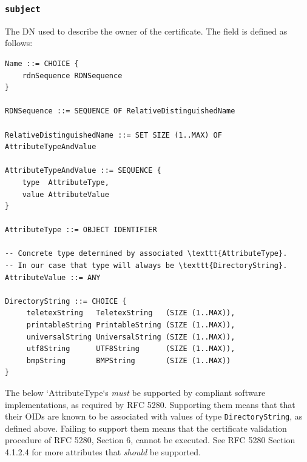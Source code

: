 \subsubsection{\texttt{subject}}

The DN used to describe the owner of the certificate.
The field is defined as follows:

\begin{verbatim}
Name ::= CHOICE {
    rdnSequence RDNSequence
}

RDNSequence ::= SEQUENCE OF RelativeDistinguishedName

RelativeDistinguishedName ::= SET SIZE (1..MAX) OF AttributeTypeAndValue

AttributeTypeAndValue ::= SEQUENCE {
    type  AttributeType,
    value AttributeValue
}

AttributeType ::= OBJECT IDENTIFIER

-- Concrete type determined by associated \texttt{AttributeType}.
-- In our case that type will always be \texttt{DirectoryString}.
AttributeValue ::= ANY

DirectoryString ::= CHOICE {
     teletexString   TeletexString   (SIZE (1..MAX)),
     printableString PrintableString (SIZE (1..MAX)),
     universalString UniversalString (SIZE (1..MAX)),
     utf8String      UTF8String      (SIZE (1..MAX)),
     bmpString       BMPString       (SIZE (1..MAX)) 
}
\end{verbatim}

The below `AttributeType`s \textit{must} be supported by compliant software implementations, as required by RFC 5280.
Supporting them means that that their OIDs are known to be associated with values of type \texttt{DirectoryString}, as defined above.
Failing to support them means that the certificate validation procedure of RFC 5280, Section 6, cannot be executed.
See RFC 5280 Section 4.1.2.4 for more attributes that \textit{should} be supported.

